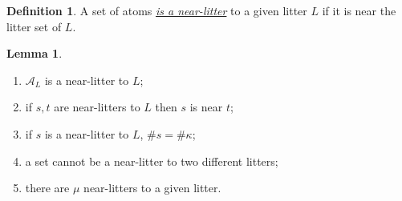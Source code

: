\documentclass{article}
\newcommand{\cdef}[3]{\href{https://leanprover-community.github.io/con-nf/doc/ConNF/#1.html\#ConNF.#2}{\emph{#3}}}
\theoremstyle{definition}
\newtheorem{definition}{Definition}[section]
\newtheorem{lemma}[theorem]{Lemma}
\theoremstyle{remark}
\begin{document}
\begin{definition}
    A set of atoms \cdef{Atom/NearLitter}{IsNearLitter}{is a near-litter} to a given litter \( L \) if it is near the litter set of \( L \).
\end{definition}
\begin{lemma}
    \label{lem:isNearLitter}
    \begin{enumerate}
        \item \( \mathcal A_L \) is a near-litter to \( L \);
        \item if \( s, t \) are near-litters to \( L \) then \( s \) is near \( t \);
        \item if \( s \) is a near-litter to \( L \), \( \#s = \#\kappa \);
        \item a set cannot be a near-litter to two different litters;
        \item there are \( \mu \) near-litters to a given litter.
    \end{enumerate}
\end{lemma}
\end{document}
